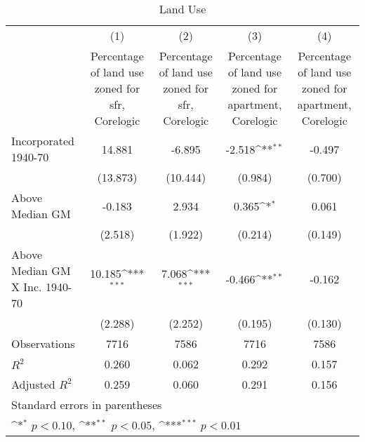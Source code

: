 \begin{table}[htbp]\centering
\def\sym#1{\ifmmode^{#1}\else\(^{#1}\)\fi}
\caption{Land Use}
\begin{tabular}{l*{4}{c}}
\hline\hline
                    &\multicolumn{1}{c}{(1)}&\multicolumn{1}{c}{(2)}&\multicolumn{1}{c}{(3)}&\multicolumn{1}{c}{(4)}\\
                    &\multicolumn{1}{c}{Percentage of land use zoned for sfr, Corelogic}&\multicolumn{1}{c}{Percentage of land use zoned for sfr, Corelogic}&\multicolumn{1}{c}{Percentage of land use zoned for apartment, Corelogic}&\multicolumn{1}{c}{Percentage of land use zoned for apartment, Corelogic}\\
\hline
Incorporated 1940-70&      14.881         &      -6.895         &      -2.518\sym{**} &      -0.497         \\
                    &    (13.873)         &    (10.444)         &     (0.984)         &     (0.700)         \\
[1em]
Above Median GM     &      -0.183         &       2.934         &       0.365\sym{*}  &       0.061         \\
                    &     (2.518)         &     (1.922)         &     (0.214)         &     (0.149)         \\
[1em]
Above Median GM X Inc. 1940-70&      10.185\sym{***}&       7.068\sym{***}&      -0.466\sym{**} &      -0.162         \\
                    &     (2.288)         &     (2.252)         &     (0.195)         &     (0.130)         \\
\hline
Observations        &        7716         &        7586         &        7716         &        7586         \\
\(R^{2}\)           &       0.260         &       0.062         &       0.292         &       0.157         \\
Adjusted \(R^{2}\)  &       0.259         &       0.060         &       0.291         &       0.156         \\
\hline\hline
\multicolumn{5}{l}{\footnotesize Standard errors in parentheses}\\
\multicolumn{5}{l}{\footnotesize \sym{*} \(p<0.10\), \sym{**} \(p<0.05\), \sym{***} \(p<0.01\)}\\
\end{tabular}
\end{table}
